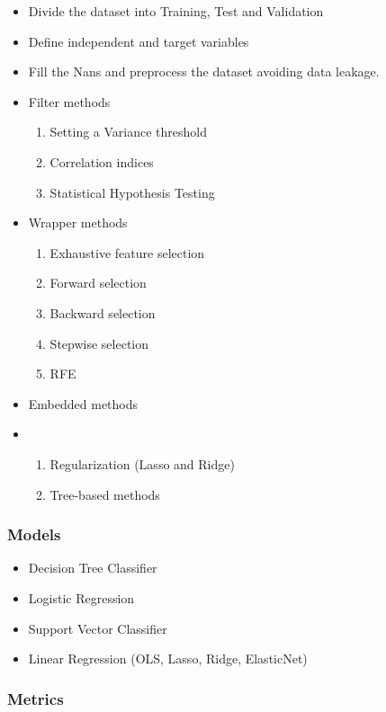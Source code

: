 \begin{itemize}
    \item Divide the dataset into Training, Test and Validation
    \item Define independent and target variables
    \item Fill the Nans and preprocess the dataset avoiding data leakage.
    \item Filter methods 
    \begin{enumerate}
        \item Setting a Variance threshold
        \item Correlation indices
        \item Statistical Hypothesis Testing
    \end{enumerate}
    \item Wrapper methods
    \begin{enumerate}
        \item Exhaustive feature selection
        \item Forward selection
        \item Backward selection
        \item Stepwise selection
        \item RFE
    \end{enumerate}
    \item Embedded methods
    \item \begin{enumerate}
        \item Regularization (Lasso and Ridge)
        \item Tree-based methods
    \end{enumerate}
\end{itemize}



\subsubsection{Models}

\begin{itemize}
    \item Decision Tree Classifier
    \item Logistic Regression
    \item Support Vector Classifier
    \item Linear Regression (OLS, Lasso, Ridge, ElasticNet)
\end{itemize}


\subsubsection{Metrics}

